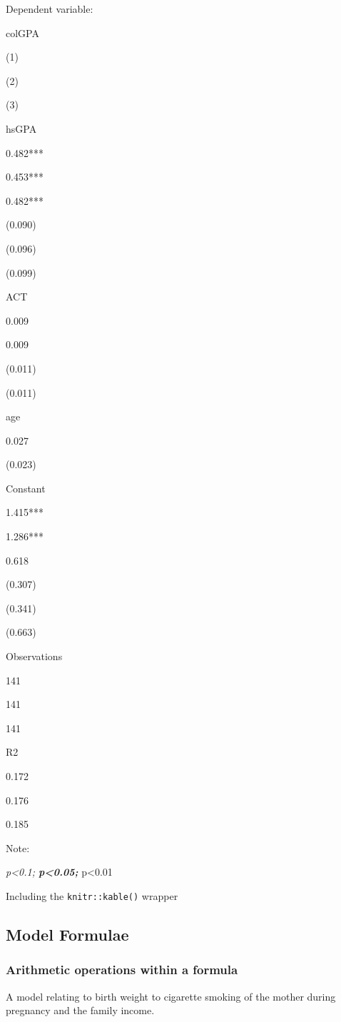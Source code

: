 \documentclass[]{book}
\begin{document}
Dependent variable:

colGPA

(1)

(2)

(3)

hsGPA

0.482***

0.453***

0.482***

(0.090)

(0.096)

(0.099)

ACT

0.009

0.009

(0.011)

(0.011)

age

0.027

(0.023)

Constant

1.415***

1.286***

0.618

(0.307)

(0.341)

(0.663)

Observations

141

141

141

R2

0.172

0.176

0.185

Note:

\emph{p\textless{}0.1; \textbf{p\textless{}0.05; }}p\textless{}0.01

Including the \texttt{knitr::kable()} wrapper

\hypertarget{model-formulae}{%
\subsection{Model Formulae}\label{model-formulae}}

\hypertarget{arithmetic-operations-within-a-formula}{%
\subsubsection{Arithmetic operations within a
formula}\label{arithmetic-operations-within-a-formula}}

A model relating to birth weight to cigarette smoking of the mother
during pregnancy and the family income.
\end{document}
